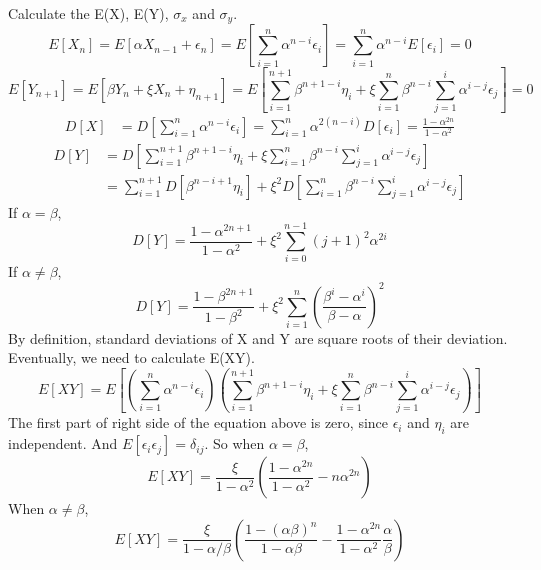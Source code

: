 \documentclass{article}
\begin{document}
		Calculate the E(X), E(Y), $\sigma_x$ and $\sigma_y$.
		\begin{equation}
			E[X_n] = E[\alpha X_{n-1}+\epsilon_n] = E[\sum^n_{i=1}\alpha^{n-i}\epsilon_i]=\sum^n_{i=1}\alpha^{n-i}E[\epsilon_i] = 0
		\end{equation}
		\begin{equation}
			E[Y_{n+1}] = E[\beta Y_{n}+\xi X_n + \eta_{n+1}] = E[\sum^{n +1}_{i=1}\beta^{n+1-i}\eta_i +\xi\sum^{n}_{i=1}\beta^{n-i}\sum^{i}_{j=1}\alpha^{i-j}\epsilon_j] = 0
		\end{equation}
		\begin{equation}
			\begin{aligned}
				D[X] & = D[\sum^n_{i=1}\alpha^{n-i}\epsilon_i] = \sum^n_{i=1}\alpha^{2(n-i)}D[\epsilon_i] = \frac{1 - \alpha^{2n}}{1-\alpha^2}
			\end{aligned}
		\end{equation}
		\begin{equation}
			\begin{aligned}
				D[Y] & = D[\sum^{n +1}_{i=1}\beta^{n+1-i}\eta_i +\xi\sum^{n}_{i=1}\beta^{n-i}\sum^{i}_{j=1}\alpha^{i-j}\epsilon_j] \\
				& = \sum^{n + 1}_{i=1}D[\beta^{n - i + 1}\eta_i] +\xi^2D[\sum^{n}_{i=1}\beta^{n-i}\sum^{i}_{j=1}\alpha^{i-j}\epsilon_j]
			\end{aligned}
		\end{equation}
		If $\alpha = \beta$,
		\begin{equation}
			D[Y] = \frac{1 - \alpha^{2n+1}}{1-\alpha^2} + \xi^2\sum^{n-1}_{i=0}(j+1)^2\alpha^{2i}
		\end{equation}
		If $\alpha\neq\beta$,
		\begin{equation}
			D[Y] = \frac{1 - \beta^{2n+1}}{1-\beta^2} + \xi^2\sum^{n}_{i=1}(\frac{\beta^i - \alpha^i}{\beta - \alpha})^2
		\end{equation}
		By definition, standard deviations of X and Y are square roots of their deviation. Eventually, we need to calculate E(XY).
		\begin{equation}
			E[XY] = E[(\sum^n_{i=1}\alpha^{n-i}\epsilon_i)(\sum^{n +1}_{i=1}\beta^{n+1-i}\eta_i +\xi\sum^{n}_{i=1}\beta^{n-i}\sum^{i}_{j=1}\alpha^{i-j}\epsilon_j)]
		\end{equation}
		The first part of right side of the equation above is zero, since $\epsilon_i$ and $\eta_i$ are independent. And $E[\epsilon_i\epsilon_j] = \delta_{ij}$. So when $\alpha = \beta$,
		\begin{equation}
			E[XY] =	\frac{\xi}{1-\alpha^2}(\frac{1-\alpha^{2n}}{1-\alpha^2} - n\alpha^{2n})
		\end{equation}
		When $\alpha\neq\beta$,
		\begin{equation}
			E[XY] =	\frac{\xi}{1-\alpha/\beta}(\frac{1-(\alpha\beta)^n}{1-\alpha\beta} - \frac{1-\alpha^{2n}}{1-\alpha^2}\frac{\alpha}{\beta})
		\end{equation}
\end{document}
